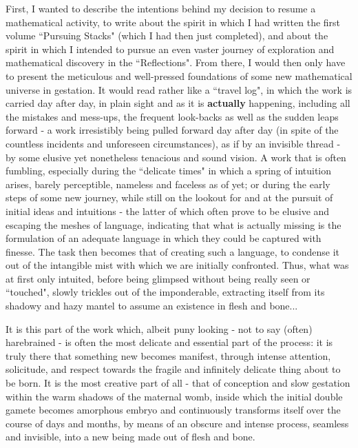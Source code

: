 First, I wanted to describe the intentions behind my decision to resume a mathematical activity, to write about the spirit in which I had written the first volume ``Pursuing Stacks" (which I had then just completed), and about the spirit in which I intended to pursue an even vaster journey of exploration and mathematical discovery in the ``Reflections". From there, I would then only have to present the meticulous and well-pressed foundations of some new mathematical universe in gestation. It would read rather like a ``travel log", in which the work is carried day after day, in plain sight and as it is \textbf{actually} happening, including all the mistakes and mess-ups, the frequent look-backs as well as the sudden leaps forward - a work irresistibly being pulled forward day after day (in spite of the countless incidents and unforeseen circumstances), as if by an invisible thread - by some elusive yet nonetheless tenacious and sound vision. A work that is often fumbling, especially during the ``delicate times" in which a spring of intuition arises, barely perceptible, nameless and faceless as of yet; or during the early steps of some new journey, while still on the lookout for and at the pursuit of initial ideas and intuitions - the latter of which often prove to be elusive and escaping the meshes of language, indicating that what is actually missing is the formulation of an adequate language in which they could be captured with finesse. The task then becomes that of creating such a language, to condense it out of the intangible mist with which we are initially confronted. Thus, what was at first only intuited, before being glimpsed without being really seen or ``touched", slowly trickles out of the imponderable, extracting itself from its shadowy and hazy mantel to assume an existence in flesh and bone...

It is this part of the work which, albeit puny looking - not to say (often) harebrained - is often the most delicate and essential part of the process: it is truly there that something new becomes manifest, through intense attention, solicitude, and respect towards the fragile and infinitely delicate thing about to be born. It is the most creative part of all - that of conception and slow gestation within the warm shadows of the maternal womb, inside which the initial double gamete becomes amorphous embryo and continuously transforms itself over the course of days and months, by means of an obscure and intense process, seamless and invisible, into a new being made out of flesh and bone.

